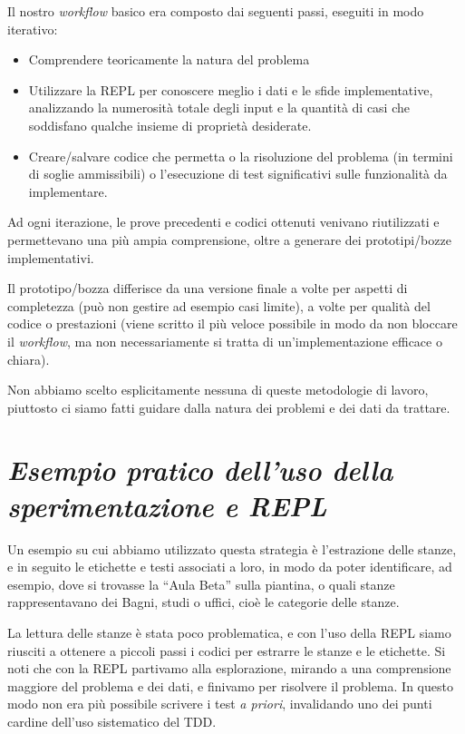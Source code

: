 \documentclass[12pt]{report}
\begin{document}
Il nostro \textit{workflow} basico era composto dai seguenti passi,
eseguiti in modo iterativo:

\begin{itemize}
	\item Comprendere teoricamente la natura del problema
	\item Utilizzare la REPL per conoscere meglio i dati e le sfide
implementative, analizzando la numerosità totale degli input e la
quantità di casi che soddisfano  qualche insieme di proprietà desiderate.
	\item Creare/salvare codice che permetta o la risoluzione del
problema (in termini di soglie ammissibili) o l'esecuzione di test
significativi sulle funzionalità da implementare.
\end{itemize}

Ad ogni iterazione, le prove precedenti e codici ottenuti venivano
riutilizzati e permettevano una più ampia comprensione, oltre a
generare dei prototipi/bozze implementativi.

Il prototipo/bozza differisce da una versione finale a volte per
aspetti di completezza (può non gestire ad esempio casi limite), a
volte per qualità del codice o prestazioni (viene scritto il più
veloce possibile in modo da non bloccare il \textit{workflow}, ma non
necessariamente si tratta di un'implementazione efficace o chiara).

Non abbiamo scelto esplicitamente nessuna di queste metodologie di
lavoro, piuttosto ci siamo fatti guidare dalla natura dei problemi e
dei dati da trattare. 

\section{\textit{Esempio pratico dell'uso della sperimentazione e REPL}}

Un esempio su cui abbiamo utilizzato questa strategia è l'estrazione
delle stanze, e in seguito le etichette e testi associati a loro, in
modo da poter identificare, ad esempio, dove si trovasse la ``Aula
Beta'' sulla piantina, o quali stanze rappresentavano dei Bagni, studi
o uffici, cioè le categorie delle stanze.

La lettura delle stanze è stata poco problematica, e con l'uso della
REPL siamo riusciti a ottenere a piccoli passi i codici per estrarre
le stanze e le etichette. Si noti che con la REPL partivamo alla
esplorazione, mirando a una comprensione maggiore del problema e dei
dati, e finivamo per risolvere il problema. In questo modo non era più
possibile scrivere i test \textit{a priori}, invalidando uno dei punti
cardine dell'uso sistematico del TDD.
\end{document}
